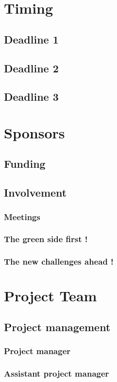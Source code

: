 \documentclass[8pt]{article} %
\begin{document}
\section{Timing}
\subsection{Deadline 1}
\subsection{Deadline 2}
\subsection{Deadline 3}

\section{Sponsors}
\subsection{Funding}
\subsection{Involvement}
\subsubsection{Meetings}
\subsubsection{The green side first !}
\subsubsection{The new challenges ahead !}

\section{Project Team}

\subsection{Project management}
\subsubsection{Project manager}
\subsubsection{Assistant project manager}
\end{document}
